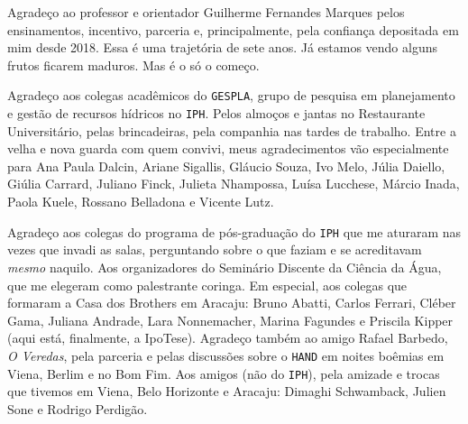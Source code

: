\documentclass[./main.tex]{subfiles}
\begin{document}
\doublespacing %
\large

\newpage
\renewcommand{\headrulewidth}{0pt}
\thispagestyle{fancy}
\fancyhf{} %
\fancyfoot{} %
\fancyfoot[C]{\thepage}

\begin{center}
    \vspace{5mm}
\end{center}
\singlespacing
\normalsize

\setlength{\parskip}{\myparskip}

\par Agradeço ao professor e orientador Guilherme Fernandes Marques pelos ensinamentos, incentivo, parceria e, principalmente, pela confiança depositada em mim desde 2018. Essa é uma trajetória de sete anos. Já estamos vendo alguns frutos ficarem maduros. Mas é o só o começo.

\par Agradeço aos colegas acadêmicos do \texttt{GESPLA}, grupo de pesquisa em planejamento e gestão de recursos hídricos no \texttt{IPH}. Pelos almoços e jantas no Restaurante Universitário, pelas brincadeiras, pela companhia nas tardes de trabalho. Entre a velha e nova guarda com quem convivi, meus agradecimentos vão especialmente para Ana Paula Dalcin, Ariane Sigallis, Gláucio Souza, Ivo Melo, Júlia Daiello, Giúlia Carrard, Juliano Finck, Julieta Nhampossa, Luísa Lucchese, Márcio Inada, Paola Kuele, Rossano Belladona e Vicente Lutz.

\par Agradeço aos colegas do programa de pós-graduação do \texttt{IPH} que me aturaram nas vezes que invadi as salas, perguntando sobre o que faziam e se acreditavam \textit{mesmo} naquilo. Aos organizadores do Seminário Discente da Ciência da Água, que me elegeram como palestrante coringa. Em especial, aos colegas que formaram a Casa dos Brothers em Aracaju: Bruno Abatti, Carlos Ferrari, Cléber Gama, Juliana Andrade, Lara Nonnemacher, Marina Fagundes e Priscila Kipper (aqui está, finalmente, a IpoTese). Agradeço também ao amigo Rafael Barbedo, \textit{O Veredas}, pela parceria e pelas discussões sobre o \texttt{HAND} em noites boêmias em Viena, Berlim e no Bom Fim. Aos amigos  (não do \texttt{IPH}), pela amizade e trocas que tivemos em Viena, Belo Horizonte e Aracaju: Dimaghi Schwamback, Julien Sone e Rodrigo Perdigão.
\end{document}
